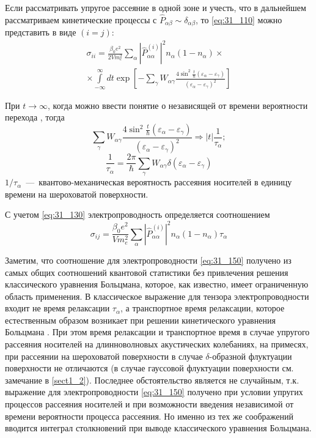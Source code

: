 Если рассматривать упругое рассеяние в одной зоне и учесть, что в дальнейшем рассматриваем кинетические процессы с ${\hat{P}}_{\alpha \beta }\sim {\delta }_{\alpha \beta }$, то \eqref{eq:31_110} можно представить в виде $(i=j)$:
\begin{multline} \label{eq:31_120}
\sigma_{ii}=\frac{{\beta }_0e^2}{2Vm^2_e}\sum_{\alpha }{{\left|{\hat{P}}^{(i)}_{\alpha \alpha }\right|}^2 n_{\alpha }\left(1-n_{\alpha }\right)}\times\\
\times\int\limits_{- \infty }^\infty {dt \exp \left[-\sum_{\gamma }{W_{\alpha \gamma }\frac{4 \sin^2 \frac{t}{\hbar}\left({\varepsilon }_{\alpha }-{\varepsilon }_{\gamma }\right)}{(\varepsilon_{\alpha } - \varepsilon_{\gamma })^2}}\right]}
\end{multline}

При $t\to \infty $, когда можно ввести понятие о независящей от времени вероятности перехода \cite{LandauT3}, тогда
\begin{equation} \label{eq:31_130}
\sum_{\gamma }{W_{\alpha \gamma }\frac{4 \sin^2 \frac{t}{\hbar}\left(\varepsilon_{\alpha } - \varepsilon_{\gamma }\right)}{(\varepsilon_{\alpha } - \varepsilon_{\gamma })^2}} \Rightarrow \left|t\right|\frac{1}{\tau_{\alpha}};
\end{equation}
\begin{equation} \label{eq:31_140}
\frac{1}{\tau_{\alpha}}=\frac{2\pi}{\hbar} \sum_{\gamma} {W_{\alpha\gamma} \delta \left(\varepsilon_{\alpha} - \varepsilon_{\gamma} \right)}
\end{equation}
${1}/{\tau_{\alpha}}$~---~квантово-механическая вероятность рассеяния носителей в единицу времени на шероховатой поверхности.

С учетом \eqref{eq:31_130} электропроводность определяется соотношением
\begin{equation} \label{eq:31_150}
{\sigma }_{ij}=\frac{{\beta }_0e^2}{Vm^2_e}\sum_{\alpha }{{\left|{\hat{P}}^{(i)}_{\alpha \alpha }\right|}^2n_{\alpha }\left(1-n_{\alpha }\right)}{\tau }_{\alpha }
\end{equation}

Заметим, что соотношение для электропроводности \eqref{eq:31_150} получено из самых общих соотношений квантовой статистики без привлечения решения классического уравнения Больцмана, которое, как известно, имеет ограниченную область применения. В классическое выражение для тензора электропроводности входит не время релаксации ${\tau }_{\alpha }$, а транспортное время релаксации, которое естественным образом возникает при решении кинетического уравнения Больцмана \cite{Anselm1978}. При этом время релаксации и транспортное время в случае упругого рассеяния носителей на длинноволновых акустических колебаниях, на примесях, при рассеянии на шероховатой поверхности в случае $\delta $-образной флуктуации поверхности не отличаются (в случае гауссовой флуктуации поверхности см. замечание в \ref{sect1_2}). Последнее обстоятельство является не случайным, т.к. выражение для электропроводности \eqref{eq:31_150} получено при условии упругих процессов рассеяния носителей и при возможности введения независимой от времени вероятности процесса рассеяния. Но именно из тех же соображений вводится интеграл столкновений при выводе классического уравнения Больцмана.

